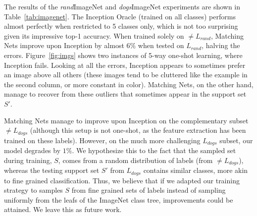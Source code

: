The results of the \emph{rand}ImageNet and \emph{dogs}ImageNet experiments are shown in Table~\ref{tab:imagenet}. The Inception Oracle (trained on all classes) performs almost perfectly when restricted to 5 classes only, which is not too surprising given its impressive top-1 accuracy. When trained solely on $\neq\!\! L_{rand}$, Matching Nets improve upon Inception by almost $6\%$ when tested on $L_{rand}$, halving the errors. Figure~\ref{fig:imgs} shows two instances of 5-way one-shot learning, where Inception fails. Looking at all the errors, Inception appears to sometimes prefer an image above all others (these images tend to be cluttered like the example in the second column, or more constant in color). Matching Nets, on the other hand, manage to recover from these outliers that sometimes appear in the support set $S'$.

Matching Nets manage to improve upon Inception on the complementary subset $\neq\!\! L_{dogs}$ (although this setup is not one-shot, as the feature extraction has been trained on these labels). However, on the much more challenging $L_{dogs}$ subset, our model degrades by $1\%$. We hypothesize this to the fact that the sampled set during training, $S$, comes from a random distribution of labels (from $\neq\!\! L_{dogs}$), whereas the testing support set $S'$ from $L_{dogs}$ contains similar classes, more akin to fine grained classification. Thus, we believe that if we adapted our training strategy to samples $S$ from fine grained sets of labels instead of sampling uniformly from the leafs of the ImageNet class tree, improvements could be attained. We leave this as future work.

